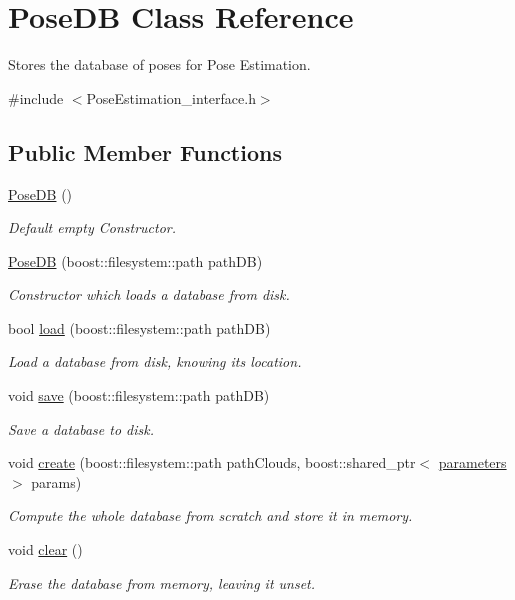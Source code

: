 \hypertarget{classPoseDB}{\section{Pose\-D\-B Class Reference}
\label{classPoseDB}
}


Stores the database of poses for Pose Estimation.  




{\ttfamily \#include $<$Pose\-Estimation\-\_\-interface.\-h$>$}

\subsection*{Public Member Functions}
\begin{DoxyCompactItemize}
\item 
\hyperlink{classPoseDB_a48e3cf9cde2b5f6a1a87e0d4f666e13f}{Pose\-D\-B} ()
\begin{DoxyCompactList}\small\item\em Default empty Constructor. \end{DoxyCompactList}\item 
\hyperlink{classPoseDB_ac7c624b7de4a42c229a9a96e1b90b0d2}{Pose\-D\-B} (boost\-::filesystem\-::path path\-D\-B)
\begin{DoxyCompactList}\small\item\em Constructor which loads a database from disk. \end{DoxyCompactList}\item 
bool \hyperlink{classPoseDB_aa4209b95406472e4eea23cd9bc12eb66}{load} (boost\-::filesystem\-::path path\-D\-B)
\begin{DoxyCompactList}\small\item\em Load a database from disk, knowing its location. \end{DoxyCompactList}\item 
void \hyperlink{classPoseDB_a3bc7a3f5efdbf367bf1be91ec4272f60}{save} (boost\-::filesystem\-::path path\-D\-B)
\begin{DoxyCompactList}\small\item\em Save a database to disk. \end{DoxyCompactList}\item 
void \hyperlink{classPoseDB_a32f79ac5a9a8be7763027a5b69b52ad1}{create} (boost\-::filesystem\-::path path\-Clouds, boost\-::shared\-\_\-ptr$<$ \hyperlink{PoseEstimation__interface_8h_acbb28d8f791bb363852e522cf3b83c47}{parameters} $>$ params)
\begin{DoxyCompactList}\small\item\em Compute the whole database from scratch and store it in memory. \end{DoxyCompactList}\item 
void \hyperlink{classPoseDB_a608ac44000f275c1085c208e7906b95d}{clear} ()
\begin{DoxyCompactList}\small\item\em Erase the database from memory, leaving it unset. \end{DoxyCompactList}\end{DoxyCompactItemize}

